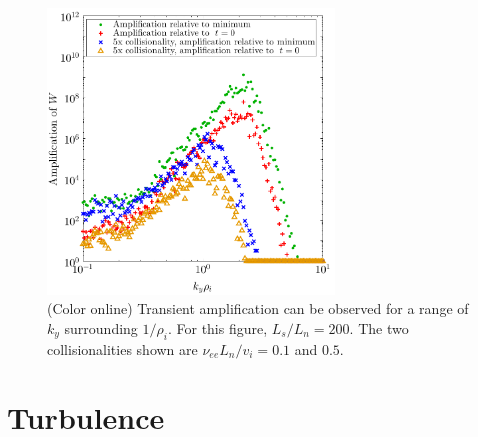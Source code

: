 \documentclass[12pt,superscriptaddress]{revtex4}
\newcommand{\nuee}{\nu_{ee}}
\begin{document}
\begin{figure}[h!]
\includegraphics[width=3in]{m20141122_01_plotTransientAmplificationKyScans.pdf}
\caption{(Color online) Transient amplification can be observed
for a range of $k_y$ surrounding $1/\rho_i$.  For this figure, $L_s/L_n=200$.
The two collisionalities shown are $\nuee L_n / v_i = 0.1$ and $0.5$.
\label{fig:transientAmplificationVsKy}}
\end{figure}



\section{Turbulence}
\label{sec:turbulence}
\end{document}
